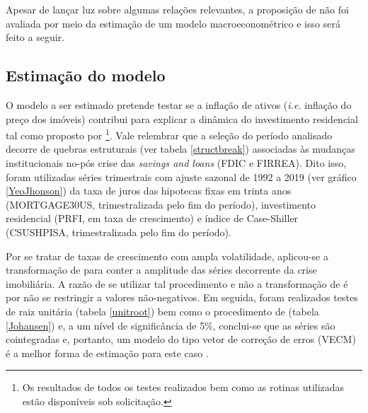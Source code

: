 Apesar de lançar luz sobre algumas relações relevantes, a proposição de \textcite{teixeira_crescimento_2015} não foi avaliada por meio da estimação de um modelo macroeconométrico e isso será feito a seguir.

\subsection{Estimação do modelo}

O modelo a ser estimado pretende testar se a inflação de ativos (\textit{i.e.} inflação do preço dos imóveis) contribui para explicar a dinâmica do investimento residencial tal como proposto por \textcite{teixeira_crescimento_2015}\footnote{Os resultados de todos os testes realizados bem como as rotinas utilizadas estão disponíveis sob solicitação.}. 
Vale relembrar que a seleção do período analisado decorre de quebras estruturais (ver tabela \ref{structbreak}) associadas às mudanças institucionais no-pós crise das \textit{savings and loans} (FDIC e FIRREA).
Dito isso, foram utilizadas séries trimestrais com ajuste sazonal de 1992 a 2019 (ver gráfico \ref{YeoJhonson}) da taxa de juros das hipotecas fixas em trinta anos (MORTGAGE30US, trimestralizada pelo fim do período), investimento residencial (PRFI, em taxa de crescimento) e índice de Case-Shiller (CSUSHPISA, trimestralizada pelo fim do período). 

Por se tratar de taxas de crescimento com ampla volatilidade, aplicou-se a transformação de \textcite{yeo_new_2000} para conter a amplitude das séries decorrente da crise imobiliária. A razão de se utilizar tal procedimento e não a transformação de \textcite{box_analysis_1964} é por não se restringir a valores não-negativos. Em seguida, foram realizados testes de raiz unitária (tabela \ref{unitroot}) bem como o procedimento de \textcite{johansen_estimation_1991} (tabela \ref{Johansen}) e, a um nível de significância de 5\%, conclui-se que as séries são cointegradas e, portanto, um modelo do tipo vetor de correção de erros (VECM) é a melhor forma de estimação para este caso \cite{enders_applied_2014}.








